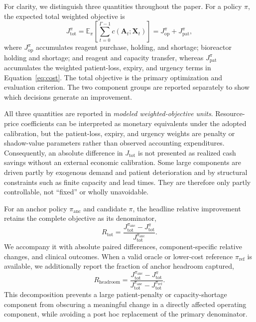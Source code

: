 \documentclass[preprint,review,12pt]{elsarticle}
\begin{document}
For clarity, we distinguish three quantities throughout the paper. For a policy
$\pi$, the expected total weighted objective is
\begin{equation}
\label{eq:episode-objective}
J^{\pi}_{\mathrm{tot}}
=
\mathbb{E}_{\pi}\!\left[
\sum_{t=0}^{\Gamma-1}c(\mathbf{A}_t;\mathbf{X}_t)
\right]
=
J^{\pi}_{\mathrm{op}}+J^{\pi}_{\mathrm{pat}},
\end{equation}
where $J^{\pi}_{\mathrm{op}}$ accumulates reagent purchase, holding, and
shortage; bioreactor holding and shortage; and reagent and capacity transfer,
whereas $J^{\pi}_{\mathrm{pat}}$ accumulates the weighted patient-loss, expiry,
and urgency terms in Equation~\eqref{eq:cost}. The total objective is the
primary optimization and evaluation criterion. The two component groups are
reported separately to show which decisions generate an improvement.

All three quantities are reported in \emph{modeled weighted-objective units}.
Resource-price coefficients can be interpreted as monetary equivalents under
the adopted calibration, but the patient-loss, expiry, and urgency weights are
penalty or shadow-value parameters rather than observed accounting
expenditures. Consequently, an absolute difference in
$J_{\mathrm{tot}}$ is not presented as realized cash savings without an
external economic calibration. Some large components are driven partly by
exogenous demand and patient deterioration and by structural constraints such
as finite capacity and lead times. They are therefore only partly controllable,
not ``fixed'' or wholly unavoidable.

For an anchor policy $\pi_{\mathrm{anc}}$ and candidate $\pi$, the headline
relative improvement retains the complete objective as its denominator,
\begin{equation}
\label{eq:relative-total-improvement}
R_{\mathrm{tot}}
=
\frac{J^{\pi_{\mathrm{anc}}}_{\mathrm{tot}}
-J^{\pi}_{\mathrm{tot}}}
{J^{\pi_{\mathrm{anc}}}_{\mathrm{tot}}}.
\end{equation}
We accompany it with absolute paired differences, component-specific relative
changes, and clinical outcomes. When a valid oracle or lower-cost reference
$\pi_{\mathrm{ref}}$ is available, we additionally report the fraction of
anchor headroom captured,
\begin{equation}
\label{eq:headroom-captured}
R_{\mathrm{headroom}}
=
\frac{J^{\pi_{\mathrm{anc}}}_{\mathrm{tot}}
-J^{\pi}_{\mathrm{tot}}}
{J^{\pi_{\mathrm{anc}}}_{\mathrm{tot}}
-J^{\pi_{\mathrm{ref}}}_{\mathrm{tot}}}.
\end{equation}
This decomposition prevents a large patient-penalty or capacity-shortage
component from obscuring a meaningful change in a directly affected operating
component, while avoiding a post hoc replacement of the primary denominator.
\end{document}
